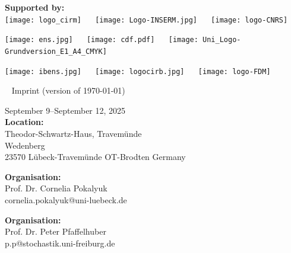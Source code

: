 \documentclass[12pt,a4paper]{article}
\makeatletter
\newcommand{\Impressum}{%
{\scriptsize%
\fboxsep0pt
{\begin{minipage}[b]{.33\textwidth}
September 9--September 12, 2025\\[.5ex]
\textbf{Location: }\\
Theodor-Schwartz-Haus, Travemünde\\
Wedenberg \\
23570 Lübeck-Travemünde OT-Brodten
Germany
\end{minipage}}
\hfill
{\begin{minipage}[b]{.36\textwidth}
\textbf{Organisation: }\\
Prof. Dr. Cornelia Pokalyuk \\
cornelia.pokalyuk@uni-luebeck.de  
\end{minipage}}%
\hfill
{\begin{minipage}[b]{.28\textwidth}
\textbf{Organisation: }\\
Prof. Dr. Peter Pfaffelhuber\\
p.p@stochastik.uni-freiburg.de
\end{minipage}} 
}}
\newcommand{\Kopfzeile}{\markboth{\Kopfzeilentext}{~\hfill\Kopfzeilentext\hfill~}}
\newcommand{\Kopfzeilentext}{\footnotesize \emph{Dynamics of interacting populations and beyond}}
\makeatother
\begin{document}
\label{Impressum--Ende}
%


\vfill
\vfill
 \newpage
 
 \textbf{Supported by: }\\
 
\texttt{[image: logo\_cirm]}
~\hfill ~
\texttt{[image: Logo-INSERM.jpg]}
~\hfill ~
\texttt{[image: logo-CNRS]}


\bigskip
\texttt{[image: ens.jpg]}
~\hfill ~
\texttt{[image: cdf.pdf]}
~\hfill ~
\texttt{[image: Uni\_Logo-Grundversion\_E1\_A4\_CMYK]}

\bigskip\bigskip
\texttt{[image: ibens.jpg]}
~\hfill ~
\texttt{[image: logocirb.jpg]}
~\hfill ~
\texttt{[image: logo-FDM]}



 ~
 \vfill
 {\scriptsize Imprint {\tiny (version of \today) }} \\[1ex]
 \Impressum
 
 \bigskip
\end{document}
